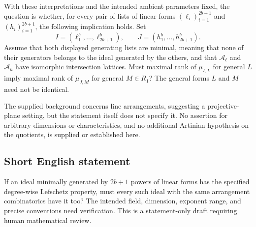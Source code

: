 \documentclass[11pt]{article}
\begin{document}
With these interpretations and the intended ambient parameters fixed, the question is whether, for every pair of lists of linear forms \((\ell_i)_{i=1}^{2b+1}\) and \((h_i)_{i=1}^{2b+1}\), the following implication holds. Set
\[
I=(\ell_1^b,\ldots,\ell_{2b+1}^b),
\qquad
J=(h_1^b,\ldots,h_{2b+1}^b).
\]
Assume that both displayed generating lists are minimal, meaning that none of their generators belongs to the ideal generated by the others, and that \(\mathcal A_{\ell}\) and \(\mathcal A_h\) have isomorphic intersection lattices. Must maximal rank of \(\mu_{I,L}\) for general \(L\) imply maximal rank of \(\mu_{J,M}\) for general \(M\in R_1\)? The general forms \(L\) and \(M\) need not be identical.

The supplied background concerns line arrangements, suggesting a projective-plane setting, but the statement itself does not specify it. No assertion for arbitrary dimensions or characteristics, and no additional Artinian hypothesis on the quotients, is supplied or established here.
\subsection{Short English statement}
If an ideal minimally generated by \(2b+1\) powers of linear forms has the specified degree-wise Lefschetz property, must every such ideal with the same arrangement combinatorics have it too? The intended field, dimension, exponent range, and precise conventions need verification. This is a statement-only draft requiring human mathematical review.
\end{document}
